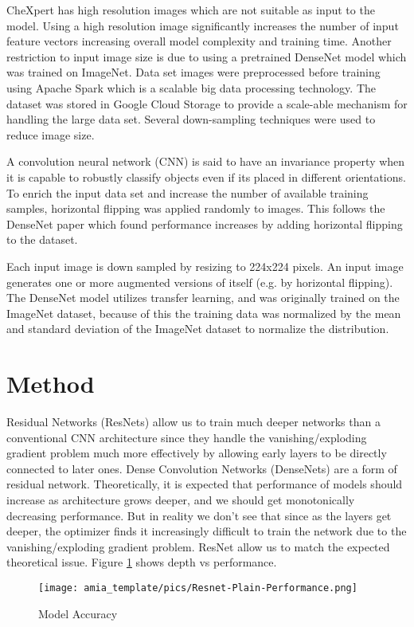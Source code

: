 \documentclass{amia}
\begin{document}
CheXpert\cite{ref2} has high resolution images which are not suitable as input to the model. Using a high resolution image significantly increases the number of input feature vectors increasing overall model complexity and training time. Another restriction to input image size is due to using a pretrained DenseNet model which was trained on ImageNet. Data set images were preprocessed before training using Apache Spark which is a scalable big data processing technology. The dataset was stored in Google Cloud Storage to provide a scale-able mechanism for handling the large data set. Several down-sampling techniques were used to reduce image size.

A convolution neural network (CNN) is said to have an invariance property when it is capable to robustly classify objects even if its placed in different orientations. To enrich the input data set and increase the number of available training samples, horizontal flipping was applied randomly to images. This follows the DenseNet paper which found performance increases by adding horizontal flipping to the dataset.

Each input image is down sampled by resizing to 224x224 pixels. An input image generates one or more augmented versions of itself (e.g. by horizontal flipping). The DenseNet model utilizes transfer learning, and was originally trained on the ImageNet dataset, because of this the training data was normalized by the mean and standard deviation of the ImageNet dataset to normalize the distribution.

\section*{Method}
Residual Networks (ResNets) allow us to train much deeper networks than a conventional CNN architecture since they handle the vanishing/exploding gradient problem much more effectively by allowing early layers to be directly connected to later ones. Dense Convolution Networks (DenseNets) are a form of residual network. Theoretically, it is expected that performance of models should increase as architecture grows deeper, and we should get monotonically decreasing performance. But in reality we don't see that since as the layers get deeper, the optimizer finds it increasingly difficult to train the network due to the vanishing/exploding gradient problem. ResNet allow us to match the expected theoretical issue. Figure \ref{fig3} shows depth vs performance.

\begin{figure}[h!]
\centering
\texttt{[image: amia\_template/pics/Resnet-Plain-Performance.png]}
\caption{Model Accuracy}
\label{fig3}
\end{figure}
\end{document}
